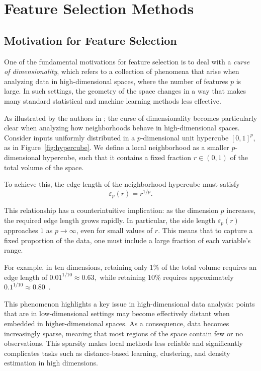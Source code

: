 \chapter{Feature Selection Methods}


\section{Motivation for Feature Selection}
\label{sec:motivation-feature-selection}
One of the fundamental motivations for feature selection is to deal with a \textit{curse of dimensionality}, which refers to a collection of phenomena that arise when analyzing data in high-dimensional spaces, where the number of features 
$p$ is large. In such settings, the geometry of the space changes in a way that makes many standard statistical and machine learning methods less effective.

As illustrated by the authors in  \cite{hastie2001}; the curse of dimensionality becomes particularly clear when analyzing how neighborhoods behave in high-dimensional spaces. Consider inputs uniformly distributed in a 
$p$-dimensional unit hypercube $[0,1]^p$, as in Figure~\ref{fig:hypercube}. We define a local neighborhood as a smaller $p$-dimensional hypercube, such that it contains a fixed fraction $r \in (0,1)$ of the total volume of the space.

To achieve this, the edge length of the neighborhood hypercube must satisfy
\begin{equation*}
    \varepsilon_p(r) = r^{1/p}.
\end{equation*}

This relationship has a counterintuitive implication: as the dimension $p$ increases, the required edge length grows rapidly. In particular, the side length $\varepsilon_p(r)$ approaches $1$ as $p \to \infty$, even for small values of $r$. This means that to capture a fixed proportion of the data, one must include a large fraction of each variable’s range.

For example, in ten dimensions, retaining only $1\%$ of the total volume requires an edge length of $0.01^{1/10} \approx 0.63,$
while retaining $10\%$ requires approximately $0.1^{1/10} \approx 0.80$~\cite{hastie2001}. 

This phenomenon highlights a key issue in high-dimensional data analysis: points that are in low-dimensional settings may become effectively distant when embedded in higher-dimensional spaces. As a consequence, data becomes increasingly sparse, meaning that most regions of the space contain few or no observations. This sparsity makes local methods less reliable and significantly complicates tasks such as distance-based learning, clustering, and density estimation in high dimensions.

